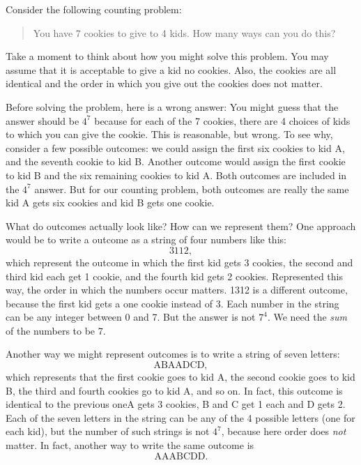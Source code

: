 \documentclass[10pt,]{book}
\theoremstyle{plain}
\theoremstyle{definition}
\theoremstyle{definition}
\theoremstyle{definition}
\numberwithin{equation}{section}
\begin{document}
Consider the following counting problem:
%
\begin{quote}
You have 7 cookies to give to 4 kids.  How many ways can you do this?
\end{quote}
\par

Take a moment to think about how you might solve this problem. You may assume that it is acceptable to give a kid no cookies. Also, the cookies are all identical and the order in which you give out the cookies does not matter.
%
\par

Before solving the problem, here is a wrong answer: You might guess that the answer should be \(4^7\) because for each of the 7 cookies, there are 4 choices of kids to which you can give the cookie. This is reasonable, but wrong. To see why, consider a few possible outcomes: we could assign the first six cookies to kid A, and the seventh cookie to kid B. Another outcome would assign the first cookie to kid B and the six remaining cookies to kid A. Both outcomes are included in the \(4^7\) answer. But for our counting problem, both outcomes are really the same \textendash{} kid A gets six cookies and kid B gets one cookie.
%
\par

What do outcomes actually look like? How can we represent them? One approach would be to write a outcome as a string of four numbers like this:
\begin{equation*}
  3112,
\end{equation*}
which represent the outcome in which the first kid gets 3 cookies, the second and third kid each get 1 cookie, and the fourth kid gets 2 cookies. Represented this way, the order in which the numbers occur matters. 1312 is a different outcome, because the first kid gets a one cookie instead of 3. Each number in the string can be any integer between 0 and 7. But the answer is not \(7^4\). We need the \emph{sum} of the numbers to be 7.
%
\par

Another way we might represent outcomes is to write a string of seven letters:
\begin{equation*}
  \mbox{ABAADCD} ,
\end{equation*}
which represents that the first cookie goes to kid A, the second cookie goes to kid B, the third and fourth cookies go to kid A, and so on. In fact, this outcome is identical to the previous one\textemdash{}A gets 3 cookies, B and C get 1 each and D gets 2. Each of the seven letters in the string can be any of the 4 possible letters (one for each kid), but the number of such strings is not \(4^7\), because here order does \emph{not} matter. In fact, another way to write the same outcome is
\begin{equation*}
  \mbox{AAABCDD} .
\end{equation*}
%
\par
\end{document}
